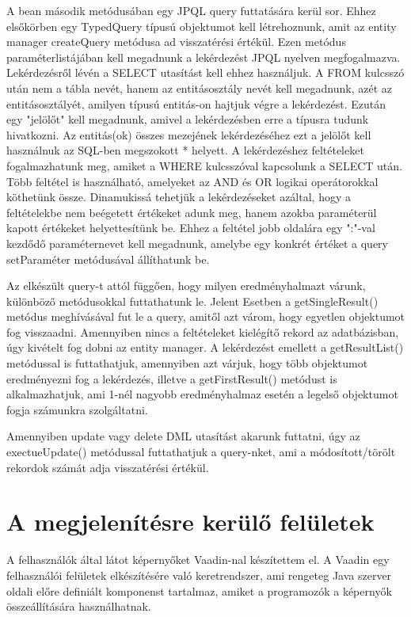 \documentclass[centeredchapter]{thesis-ekf}
\theoremstyle{definition}
\theoremstyle{remark}
\begin{document}
A bean második metódusában egy JPQL query futtatására kerül sor. Ehhez elsőkörben egy TypedQuery típusú objektumot kell létrehoznunk, amit az entity manager createQuery metódusa ad visszatérési értékül. Ezen metódus paraméterlistájában kell megadnunk a lekérdezést JPQL nyelven megfogalmazva. Lekérdezésről lévén a SELECT utasítást kell ehhez használjuk. A FROM kulcsszó után nem a tábla nevét, hanem az entitásosztály nevét kell megadnunk, azét az entitásosztályét, amilyen típusú entitás-on hajtjuk végre a lekérdezést. Ezután egy "jelölőt" kell megadnunk, amivel a lekérdezésben erre a típusra tudunk hivatkozni. Az entitás(ok) összes mezejének lekérdezéséhez ezt a jelölőt kell használnuk az SQL-ben megszokott * helyett. A lekérdezéshez feltételeket fogalmazhatunk meg, amiket a WHERE kulcsszóval kapcsolunk a SELECT után. Több feltétel is használható, amelyeket az AND és OR logikai operátorokkal köthetünk össze. Dinamukissá tehetjük a lekérdezéseket azáltal, hogy a feltételekbe nem beégetett értékeket adunk meg, hanem azokba paraméterül kapott értékeket helyettesítünk be. Ehhez a feltétel jobb oldalára egy ":"-val kezdődő paraméternevet kell megadnunk, amelybe egy konkrét értéket a query setParaméter metódusával állíthatunk be.

Az elkészült query-t attól függően, hogy milyen eredményhalmazt várunk, különböző metódusokkal futtathatunk le. Jelent Esetben a getSingleResult() metódus meghívásával fut le a query, amitől azt várom, hogy egyetlen objektumot fog visszaadni. Amennyiben nincs a feltételeket kielégítő rekord az adatbázisban, úgy kivételt fog dobni az entity manager.
A lekérdezést emellett a getResultList() metódussal is futtathatjuk, amennyiben azt várjuk, hogy több objektumot eredményezni fog a lekérdezés, illetve a getFirstResult() metódust is alkalmazhatjuk, ami 1-nél nagyobb eredményhalmaz esetén a legelső objektumot fogja számunkra szolgáltatni.

Amennyiben update vagy delete DML utasítást akarunk futtatni, úgy az exectueUpdate() metódussal futtathatjuk a query-nket, ami a módosított/törölt rekordok számát adja visszatérési értékül. 

\section{A megjelenítésre kerülő felületek}

A felhasználók által látot képernyőket Vaadin-nal készítettem el. A Vaadin egy felhasználói felületek elkészítésére való keretrendszer, ami rengeteg Java szerver oldali előre definiált komponenst tartalmaz, amiket a programozók a képernyők összeállítására használhatnak. 
\end{document}
